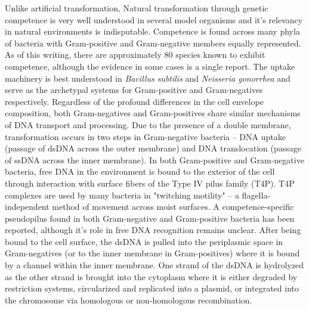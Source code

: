 Unlike artificial transformation, Natural transformation through genetic
competence is very well understood in several model organisms and it's relevancy
in natural environments is indisputable. Competence is found across many phyla
of bacteria with Gram-positive and Gram-negative members equally represented. As
of this writing, there are approximately 80 species known to exhibit
competence\cite{Johnston:2014dc}, although the evidence in some cases is a
single report.  The uptake machinery is best understood in \textit{Bacillus
subtilis} and \textit{Neisseria gonorrhea} and serve as the archetypal systems
for Gram-positive and Gram-negatives respectively. Regardless of the profound
differences in the cell envelope composition, both Gram-negatives and
Gram-positives share similar mechanisms of DNA transport and processing. Due to
the presence of a double membrane, transformation occurs in two steps in
Gram-negative bacteria -- DNA uptake (passage of dsDNA across the outer
membrane) and DNA translocation (passage of ssDNA across the inner membrane). In
both Gram-positive and Gram-negative bacteria, free DNA in the environment is
bound to the exterior of the cell through interaction with surface fibers of the
Type IV pilus family (T4P)\cite{Burton:2010eea}. T4P complexes are used by many
bacteria in "twitching motility" -- a flagella-independent method of movement
across moist surfaces\cite{Mattick:2002il}. A competence-specific pseudopilus
found in both Gram-negative and Gram-positive bacteria has been reported,
although it's role in free DNA recognition remains
unclear\cite{Anonymous:_TSDp-Ca}. After being bound to the cell surface, the
dsDNA is pulled into the periplasmic space in Gram-negatives (or to the inner
membrane in Gram-positives) where it is bound by a channel within the inner
membrane. One strand of the dsDNA is hydrolyzed as the other strand is brought
into the cytoplasm where it is either degraded by restriction systems,
circularized and replicated into a plasmid, or integrated into the chromosome
via homologous or non-homologous recombination.


